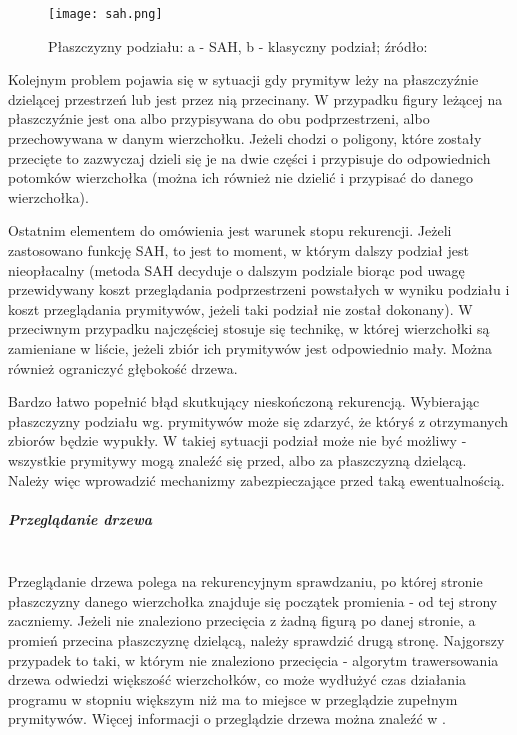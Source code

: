 \begin{figure}[H]
\centering
  \texttt{[image: sah.png]}
  \caption{Płaszczyzny podziału: a - SAH, b - klasyczny podział; źródło: \cite{zuk2008}}
\end{figure}

\pagebreak
Kolejnym problem pojawia się w sytuacji gdy prymityw leży na płaszczyźnie dzielącej przestrzeń lub jest przez nią przecinany. W przypadku figury leżącej na płaszczyźnie jest ona albo przypisywana do obu podprzestrzeni, albo przechowywana w danym wierzchołku. Jeżeli chodzi o poligony, które zostały przecięte to zazwyczaj dzieli się je na dwie części i przypisuje do odpowiednich potomków wierzchołka (można ich również nie dzielić i przypisać do danego wierzchołka).

Ostatnim elementem do omówienia jest warunek stopu rekurencji. Jeżeli zastosowano funkcję SAH, to jest to moment, w którym dalszy podział jest nieopłacalny (metoda SAH decyduje o dalszym podziale biorąc pod uwagę przewidywany koszt przeglądania podprzestrzeni powstałych w wyniku podziału i koszt przeglądania prymitywów, jeżeli taki podział nie został dokonany). W przeciwnym przypadku najczęściej stosuje się technikę, w której wierzchołki są zamieniane w liście, jeżeli zbiór ich prymitywów jest odpowiednio mały. Można również ograniczyć głębokość drzewa. 

Bardzo łatwo popełnić błąd skutkujący nieskończoną rekurencją. Wybierając płaszczyzny podziału wg. prymitywów może się zdarzyć, że któryś z otrzymanych zbiorów będzie wypukły. W takiej sytuacji podział może nie być możliwy - wszystkie prymitywy mogą znaleźć się przed, albo za płaszczyzną dzielącą. Należy więc wprowadzić mechanizmy zabezpieczające przed taką ewentualnością.

\subparagraph{Przeglądanie drzewa}\mbox{} \\

Przeglądanie drzewa polega na rekurencyjnym sprawdzaniu, po której stronie płaszczyzny danego wierzchołka znajduje się początek promienia - od tej strony zaczniemy. Jeżeli nie znaleziono przecięcia z żadną figurą po danej stronie, a promień przecina płaszczyznę dzielącą, należy sprawdzić drugą stronę. Najgorszy przypadek to taki, w którym nie znaleziono przecięcia - algorytm trawersowania drzewa odwiedzi większość wierzchołków, co może wydłużyć czas działania programu w stopniu większym niż ma to miejsce w przeglądzie zupełnym prymitywów. Więcej informacji o przeglądzie drzewa można znaleźć w \cite{bspfaq, trees}.
